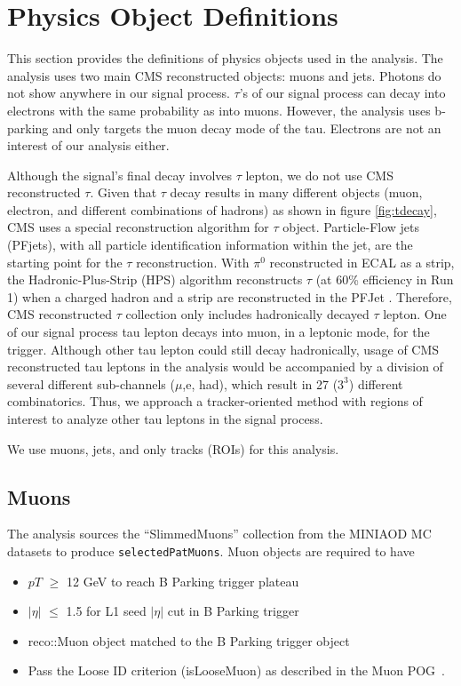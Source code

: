 \clearpage
\chapter{Physics Object Definitions}\label{sec:objects}

This section provides the definitions of physics objects used in the analysis.
The analysis uses two main CMS reconstructed objects: muons and jets.
Photons do not show anywhere in our signal process.
$\tau$'s of our signal process can decay into electrons with the same probability as into muons.
However, the analysis uses b-parking and only targets the muon decay mode of the tau.
Electrons are not an interest of our analysis either.

Although the signal's final decay involves $\tau$ lepton, we do not use CMS reconstructed $\tau$.
Given that $\tau$ decay results in many different objects (muon, electron, and different combinations of hadrons) as shown in figure \ref{fig:tdecay}, CMS uses a special reconstruction algorithm for $\tau$ object.
Particle-Flow jets (PFjets), with all particle identification information within the jet, are the starting point for the $\tau$ reconstruction.
With $\pi^{0}$ reconstructed in ECAL as a strip, the Hadronic-Plus-Strip (HPS) algorithm reconstructs $\tau$ (at 60\% efficiency in Run 1) when a charged hadron and a strip are reconstructed in the PFJet \cite{HPS}.
Therefore, CMS reconstructed $\tau$ collection only includes hadronically decayed $\tau$ lepton.
One of our signal process tau lepton decays into muon, in a leptonic mode, for the trigger.
Although other tau lepton could still decay hadronically, usage of CMS reconstructed tau leptons in the analysis would be accompanied by a division of several different sub-channels ($\mu$,e, had), which result in 27 ($3^{3}$) different combinatorics.
Thus, we approach a tracker-oriented method with regions of interest to analyze other tau leptons in the signal process.

We use muons, jets, and only tracks (ROIs) for this analysis.
\section{Muons}\label{sec:muons}
The analysis sources the ``SlimmedMuons'' collection from the MINIAOD MC datasets to produce {\tt selectedPatMuons}.
Muon objects are required to have 
\begin{itemize}
  \item $pT$ $\geq$ 12 GeV to reach B Parking trigger plateau
  \item $|\eta|$ $\leq$ 1.5 for L1 seed $|\eta|$ cut in B Parking trigger
  \item reco::Muon object matched to the B Parking trigger object
  \item Pass the Loose ID criterion (isLooseMuon) as described in the Muon POG~\cite{muonpog}.
\end{itemize}

